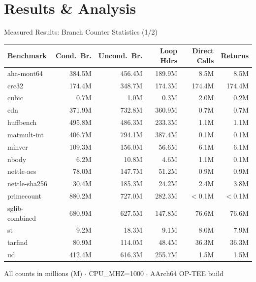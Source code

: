 \documentclass[aspectratio=169, 10pt]{beamer}
\begin{document}
\section{Results \& Analysis}

\begin{frame}{Measured Results: Branch Counter Statistics (1/2)}
    \begin{center}
    \renewcommand{\arraystretch}{1.15}
    \scriptsize
    \begin{tabular}{lrrrrr}
        \toprule
        \textbf{Benchmark} &
        \textbf{Cond.\ Br.} &
        \textbf{Uncond.\ Br.} &
        \textbf{Loop Hdrs} &
        \textbf{Direct Calls} &
        \textbf{Returns} \\
        \midrule
        aha-mont64    & 384.5M & 456.4M & 189.9M &   8.5M &   8.5M \\
        crc32         & 174.4M & 348.7M & 174.3M & 174.4M & 174.4M \\
        cubic         &   0.7M &   1.0M &   0.3M &   2.0M &   0.2M \\
        edn           & 371.9M & 732.8M & 360.9M &   0.7M &   0.7M \\
        huffbench     & 495.8M & 486.3M & 233.3M &   1.1M &   1.1M \\
        matmult-int   & 406.7M & 794.1M & 387.4M &   0.1M &   0.1M \\
        minver        & 109.3M & 156.0M &  56.6M &   6.1M &   6.1M \\
        nbody         &   6.2M &  10.8M &   4.6M &   1.1M &   0.1M \\
        nettle-aes    &  78.0M & 147.7M &  51.2M &   0.9M &   0.9M \\
        nettle-sha256 &  30.4M & 185.3M &  24.2M &   2.4M &   3.8M \\
        primecount    & 880.2M & 727.0M & 282.3M & $<$0.1M & $<$0.1M \\
        sglib-combined& 680.9M & 627.5M & 147.8M &  76.6M &  76.6M \\
        st            &   9.2M &  18.3M &   9.1M &   8.0M &   7.9M \\
        tarfind       &  80.9M & 114.0M &  48.4M &  36.3M &  36.3M \\
        ud            & 412.4M & 616.3M & 255.7M &   1.5M &   1.5M \\
        \bottomrule
    \end{tabular}
    \end{center}
    \vspace{2pt}
    \centering\tiny All counts in millions (M) $\cdot$ CPU\_MHZ=1000 $\cdot$ AArch64 OP-TEE build
\end{frame}
\end{document}
